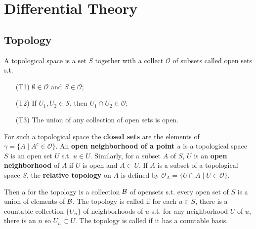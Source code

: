 \chapter{Differential Theory}
\section{Topology}
\begin{definition}
A topological space is a set $S$ together with a collect $\mathcal{O}$ of subsets called open sets s.t.
\begin{enumerate}
\item[(T1)] $\emptyset\in \mathcal{O}$ and $S\in \mathcal{O}$;
\item[(T2)] If $U_1,U_2\in \mathcal{S}$, then $U_1\cap U_2 \in \mathcal{O}$;
\item[(T3)] The union of any collection of open sets is open.
\end{enumerate}
\end{definition}
For such a topological space the \textbf{closed sets} are the elements of $\gamma=\{A\mid A^c\in \mathcal{O}\}$.
An \textbf{open neighborhood of a point} $u$ is a topological space $S$ is an open set $U$ s.t. $u\in U$. Similarly,
for a subset $A$ of $S$, $U$ is an \textbf{open neighborhood} of $A$ if $U$ is open and $A\subset U$. If $A$ is a
subset of a topological space $S$, the \textbf{relative topology} on $A$ is defined by $\mathcal{O}_A=\{U\cap A\mid
U\in\mathcal{O}\}$. 

Then a  for the topology is a collection $\mathcal{B}$ of opensets s.t. every open set of $S$ is a union of 
elements of $\mathcal{B}$. The topology is called  if for each $u\in S$, there is a countable collection
$\{U_n\}$ of neighborhoods of $u$ s.t. for any neighborhood $U$ of $u$, there is an $n$ so $U_n \subset U$. The
topology is called  if it has a countable basis. 

